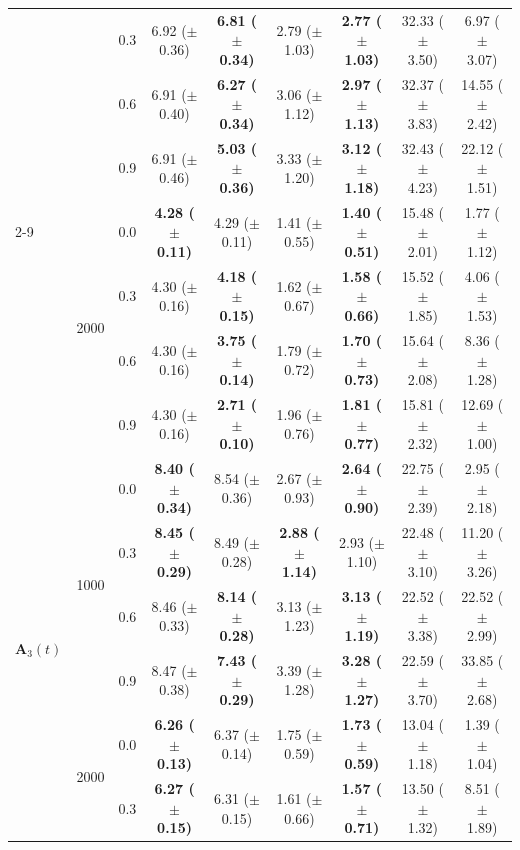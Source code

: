 \begin{table}[htbp]
{\begin{tabular}{lll|cc|cc|cc}
 &  & 0.3 & 6.92 ($\pm$ 0.36) & \textbf{6.81 ($\pm$ 0.34)} & 2.79 ($\pm$ 1.03) & \textbf{2.77 ($\pm$ 1.03)} & 32.33 ($\pm$ 3.50) & 6.97 ($\pm$ 3.07) \\
 &  & 0.6 & 6.91 ($\pm$ 0.40) & \textbf{6.27 ($\pm$ 0.34)} & 3.06 ($\pm$ 1.12) & \textbf{2.97 ($\pm$ 1.13)} & 32.37 ($\pm$ 3.83) & 14.55 ($\pm$ 2.42) \\
 &  & 0.9 & 6.91 ($\pm$ 0.46) & \textbf{5.03 ($\pm$ 0.36)} & 3.33 ($\pm$ 1.20) & \textbf{3.12 ($\pm$ 1.18)} & 32.43 ($\pm$ 4.23) & 22.12 ($\pm$ 1.51) \\
\cline{2-9}
 & \multirow{4}{*}{2000} & 0.0 & \textbf{4.28 ($\pm$ 0.11)} & 4.29 ($\pm$ 0.11) & 1.41 ($\pm$ 0.55) & \textbf{1.40 ($\pm$ 0.51)} & 15.48 ($\pm$ 2.01) & 1.77 ($\pm$ 1.12) \\
 &  & 0.3 & 4.30 ($\pm$ 0.16) & \textbf{4.18 ($\pm$ 0.15)} & 1.62 ($\pm$ 0.67) & \textbf{1.58 ($\pm$ 0.66)} & 15.52 ($\pm$ 1.85) & 4.06 ($\pm$ 1.53) \\
 &  & 0.6 & 4.30 ($\pm$ 0.16) & \textbf{3.75 ($\pm$ 0.14)} & 1.79 ($\pm$ 0.72) & \textbf{1.70 ($\pm$ 0.73)} & 15.64 ($\pm$ 2.08) & 8.36 ($\pm$ 1.28) \\
 &  & 0.9 & 4.30 ($\pm$ 0.16) & \textbf{2.71 ($\pm$ 0.10)} & 1.96 ($\pm$ 0.76) & \textbf{1.81 ($\pm$ 0.77)} & 15.81 ($\pm$ 2.32) & 12.69 ($\pm$ 1.00) \\
\hline
\multirow{8}{*}{$\mathbf{A}_3(t)$} & \multirow{4}{*}{1000} & 0.0 & \textbf{8.40 ($\pm$ 0.34)} & 8.54 ($\pm$ 0.36) & 2.67 ($\pm$ 0.93) & \textbf{2.64 ($\pm$ 0.90)} & 22.75 ($\pm$ 2.39) & 2.95 ($\pm$ 2.18) \\
 &  & 0.3 & \textbf{8.45 ($\pm$ 0.29)} & 8.49 ($\pm$ 0.28) & \textbf{2.88 ($\pm$ 1.14)} & 2.93 ($\pm$ 1.10) & 22.48 ($\pm$ 3.10) & 11.20 ($\pm$ 3.26) \\
 &  & 0.6 & 8.46 ($\pm$ 0.33) & \textbf{8.14 ($\pm$ 0.28)} & 3.13 ($\pm$ 1.23) & \textbf{3.13 ($\pm$ 1.19)} & 22.52 ($\pm$ 3.38) & 22.52 ($\pm$ 2.99) \\
 &  & 0.9 & 8.47 ($\pm$ 0.38) & \textbf{7.43 ($\pm$ 0.29)} & 3.39 ($\pm$ 1.28) & \textbf{3.28 ($\pm$ 1.27)} & 22.59 ($\pm$ 3.70) & 33.85 ($\pm$ 2.68) \\
\cline{2-9}
 & \multirow{4}{*}{2000} & 0.0 & \textbf{6.26 ($\pm$ 0.13)} & 6.37 ($\pm$ 0.14) & 1.75 ($\pm$ 0.59) & \textbf{1.73 ($\pm$ 0.59)} & 13.04 ($\pm$ 1.18) & 1.39 ($\pm$ 1.04) \\
 &  & 0.3 & \textbf{6.27 ($\pm$ 0.15)} & 6.31 ($\pm$ 0.15) & 1.61 ($\pm$ 0.66) & \textbf{1.57 ($\pm$ 0.71)} & 13.50 ($\pm$ 1.32) & 8.51 ($\pm$ 1.89) \\

\end{tabular}}
\end{table}
